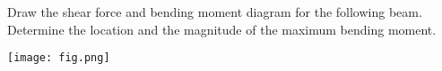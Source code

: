 
Draw the shear force and bending moment diagram for the following beam. Determine the location and the
magnitude of the maximum bending moment.
\begin{figure*}[ht!]
  \centering
  \texttt{[image: fig.png]}
\end{figure*}

\iftoggle{flagSoln}{%
\vspace{.5cm}
\rule{\textwidth}{.4pt}
\vspace{.5cm}
\textbf{Solution:}
\begin{figure}[ht!]
  \centering
  \frame{\texttt{[image: soln.png]}}
\end{figure}
}{%
}%
